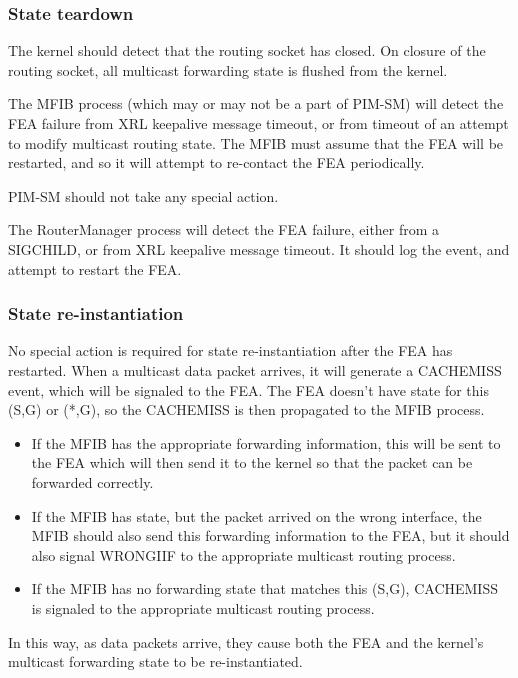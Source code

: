 \documentclass[11pt]{article}
\begin{document}
\subsubsection*{State teardown}
The kernel should detect that the routing socket has closed.  On
closure of the routing socket, all multicast forwarding state is
flushed from the kernel.

The MFIB process (which may or may not be a part of PIM-SM) will
detect the FEA failure from XRL keepalive message timeout, or from
timeout of an attempt to modify multicast routing state.  The MFIB
must assume that the FEA will be restarted, and so it will attempt to
re-contact the FEA periodically.

PIM-SM should not take any special action.

The RouterManager process will detect the FEA failure, either from a
SIGCHILD, or from XRL keepalive message timeout.  It should log the
event, and attempt to restart the FEA.

\subsubsection*{State re-instantiation}
No special action is required for state re-instantiation after the FEA
has restarted.  When a multicast data packet arrives, it will generate
a CACHEMISS event, which will be signaled to the FEA.  The FEA
doesn't have state for this (S,G) or (*,G), so the CACHEMISS is then
propagated to the MFIB process. 
\begin{itemize}
\item If the MFIB has the appropriate forwarding information, this
will be sent to the FEA which will then send it to the kernel so that
the packet can be forwarded correctly.  
\item If the MFIB has state, but the packet arrived on the wrong
interface, the MFIB should also send this forwarding information to the
FEA, but it should also signal WRONGIIF to the appropriate multicast
routing process.
\item If the MFIB has no forwarding state that matches this (S,G),
CACHEMISS is signaled to the appropriate multicast routing process.
\end{itemize}
In this way, as data packets arrive, they cause both the FEA and the
kernel's multicast forwarding state to be re-instantiated.



\end{document}
